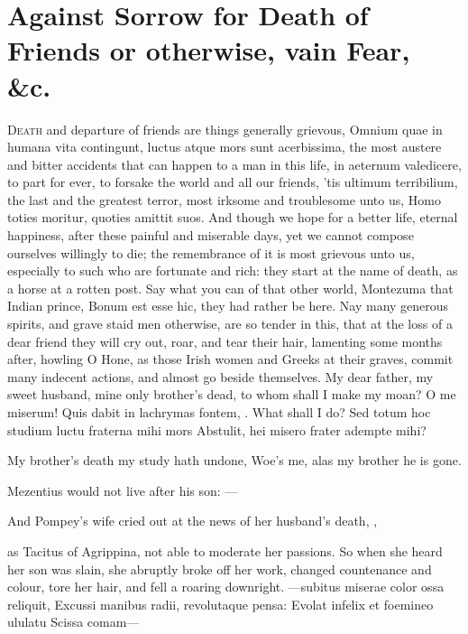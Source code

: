 {%

\section{Against Sorrow for Death of Friends or otherwise, vain Fear, \&c.}

\lettrine{D}{eath} and departure of friends are things generally grievous, 
Omnium quae in humana vita contingunt, luctus atque mors sunt
acerbissima, the most austere and bitter accidents that can happen to a
man in this life, in aeternum valedicere, to part for ever, to forsake
the world and all our friends, 'tis ultimum terribilium, the last and
the greatest terror, most irksome and troublesome unto us, Homo
toties moritur, quoties amittit suos. And though we hope for a better
life, eternal happiness, after these painful and miserable days, yet we
cannot compose ourselves willingly to die; the remembrance of it is
most grievous unto us, especially to such who are fortunate and rich:
they start at the name of death, as a horse at a rotten post. Say what
you can of that other world, Montezuma that Indian prince, Bonum
est esse hic, they had rather be here. Nay many generous spirits, and
grave staid men otherwise, are so tender in this, that at the loss of a
dear friend they will cry out, roar, and tear their hair, lamenting
some months after, howling O Hone, as those Irish women and
Greeks at their graves, commit many indecent actions, and almost
go beside themselves. My dear father, my sweet husband, mine only
brother's dead, to whom shall I make my moan? O me miserum! Quis dabit
in lachrymas fontem, \etc{}. What shall I do?
Sed totum hoc studium luctu fraterna mihi mors
Abstulit, hei misero frater adempte mihi?

My brother's death my study hath undone,
Woe's me, alas my brother he is gone.

Mezentius would not live after his son:
---

And Pompey's wife cried out at the news of her husband's death,
,

as Tacitus of Agrippina, not able to moderate her passions. So
when she heard her son was slain, she abruptly broke off her work,
changed countenance and colour, tore her hair, and fell a roaring
downright.
---subitus miserae color ossa reliquit,
Excussi manibus radii, revolutaque pensa:
Evolat infelix et foemineo ululatu
Scissa comam---

}
